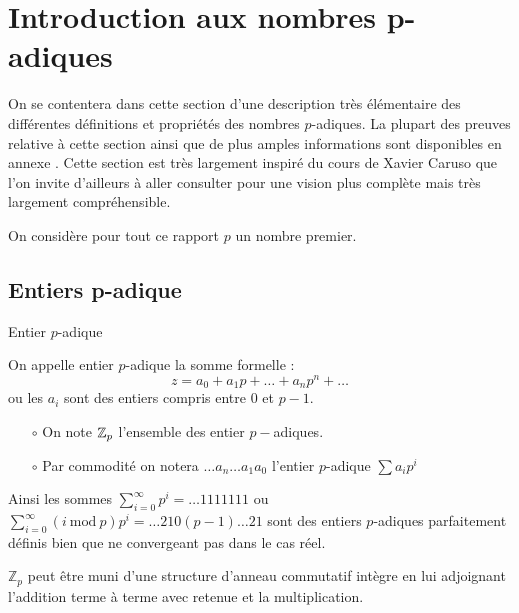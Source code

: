 \section{Introduction aux nombres \texorpdfstring{p}{$p$}-adiques}

On se contentera dans cette section d'une description très élémentaire des différentes définitions et propriétés des nombres $p$-adiques. La plupart des preuves relative à cette section ainsi que de plus amples informations sont disponibles en annexe . Cette section est très largement inspiré du cours de Xavier Caruso \parencite{caruso_computations_2017} que l'on invite d'ailleurs à aller consulter pour une vision plus complète mais très largement compréhensible.

\begin{notation}
	On considère pour tout ce rapport $p$ un nombre premier.
\end{notation}

\subsection{Entiers \texorpdfstring{p}{$p$}-adique} 
\begin{definition}{Entier $p$-adique }

On appelle entier $p$-adique la somme formelle :
\[
	z  = a_0 + a_1 p + \ldots+a_{n}p^n+\ldots
\]
ou les $a_i$ sont des entiers compris entre $0$ et $p-1$.

\end{definition}

\begin{remarques}
	\begin{itemize}
		\item[$\circ$]  On note $ \mathbb {Z}_p $ l'ensemble des entier $p-$adiques.
		\item[$\circ$] Par commodité on notera $\ldots a_n\ldots a_1 a_0$ l'entier $p$-adique $\sum a_{i}p^i$ 
\end{itemize}
\end{remarques}

\begin{ex}

	Ainsi les sommes $\sum\limits_{i=0}^{ \infty} p^i = \ldots1111111$ ou $\sum\limits_{i=0}^{ \infty} (i\ \text{mod}\ p) p^i = \ldots210(p-1)\ldots21 $ sont des entiers $p$-adiques parfaitement définis bien que ne convergeant pas dans le cas réel. 
\end{ex}

\begin{propriete}
	$\mathbb{Z}_p$ peut être muni d'une structure d'anneau commutatif intègre en lui adjoignant l'addition terme à terme avec retenue et la multiplication.
\end{propriete}

